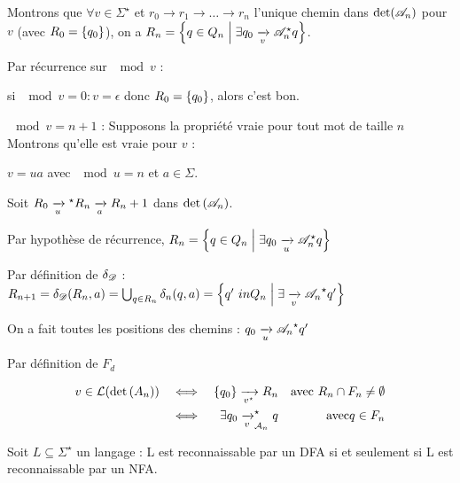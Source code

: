 \documentclass[a4paper,french,bookmarks]{book}
\begin{document}
    \begin{nproof}
        Montrons que $\forall v \in \Sigma^\star$ et $r_0 \to r_1 \to \dots \to r_n$ l'unique chemin dans $\det \p{\bsA_n}$ pour $v$ (avec $R_0 = \left\{q_0\right\}$), on a $R_n = \ens{q \in Q_n \enstq \exists q_0 \lima{v}{\bsA_n^\star} q}$.
        
        Par récurrence sur $\mod{v}$ :
        \begin{enumerate}
            \itt si $\mod{v} = 0 : v = \epsilon$ donc $R_0 = \left\{q_0\right\}$, alors c'est bon.
            
            \itt $\mod{v} = n + 1$ : Supposons la propriété vraie pour tout mot de taille $n$ Montrons qu'elle est vraie pour $v$ :
            
            $v = ua$ avec $\mod{u} = n$ et $a \in \Sigma$.
            
            Soit $R_0 \lima{u} {}^\star R_n \lima{a}{} R_n+1$ dans $ \det{\bsA_n}$.
            
            Par hypothèse de récurrence, $R_n = \ens{q \in Q_n \enstq \exists q_0 \lima{u}{\bsA_n^\star} q}$
            
            Par définition de $\delta_{\mathscr{D}}$ :
            $R_{n+1} = \delta_\bsD \p{R_n, a} = \bigcup_{q \in R_n} \delta_n \p{q, a} = \ens{q' \ in Q_n \enstq \exists \lima{v}{\bsA_n}^\star q'}$
            
            \itt On a fait toutes les positions des chemins : $q_0 \lima{u}{\bsA_n}^\star q'$
        
        
        
            Par définition de $F_d$
            
            \begin{align*}
                v \in \bcL\p{\det{A_n}} &&\iff&& \ens{q_0} \lima{v^\star} R_n &&\text{avec} \ R_n \cap F_n \neq \emptyset\\
                &&\iff&& \exists q_0 \lima{v}^\star_{\bcA_n} q &&\text{avec} q \in F_n
            \end{align*}
            
        \end{enumerate}
    \end{nproof}
    
    \begin{corollary}{}{}
        Soit $L \subseteq \Sigma^\star$ un langage : L est reconnaissable par un DFA si et seulement si L est reconnaissable par un NFA.
    \end{corollary}
    
\end{document}
